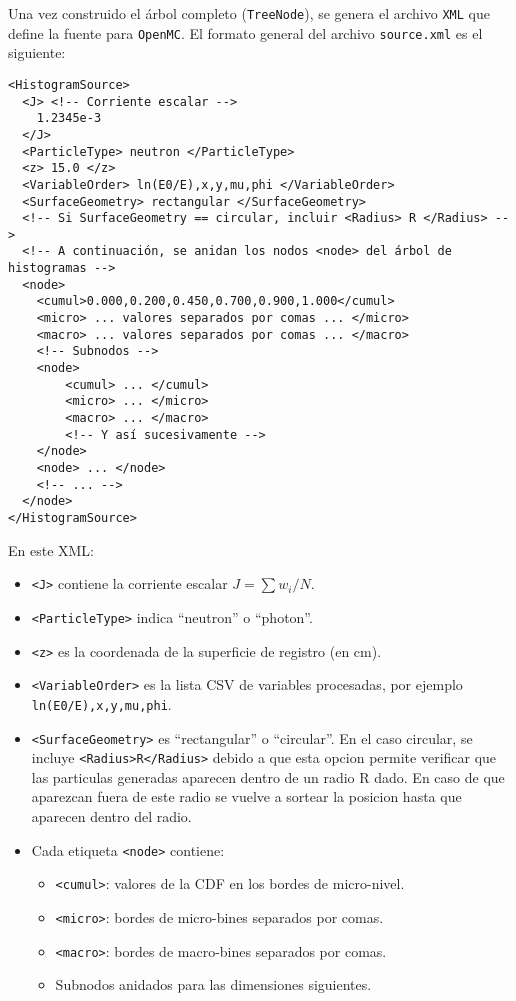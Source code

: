 Una vez construido el árbol completo (\texttt{TreeNode}), se genera el archivo \texttt{XML} que define la fuente para \texttt{OpenMC}. El formato general del archivo \texttt{source.xml} es el siguiente:

\begin{verbatim}
<HistogramSource>
  <J> <!-- Corriente escalar -->
    1.2345e-3
  </J>
  <ParticleType> neutron </ParticleType>
  <z> 15.0 </z>
  <VariableOrder> ln(E0/E),x,y,mu,phi </VariableOrder>
  <SurfaceGeometry> rectangular </SurfaceGeometry>
  <!-- Si SurfaceGeometry == circular, incluir <Radius> R </Radius> -->
  <!-- A continuación, se anidan los nodos <node> del árbol de histogramas -->
  <node>
    <cumul>0.000,0.200,0.450,0.700,0.900,1.000</cumul>
    <micro> ... valores separados por comas ... </micro>
    <macro> ... valores separados por comas ... </macro>
    <!-- Subnodos -->
    <node>
        <cumul> ... </cumul>
        <micro> ... </micro>
        <macro> ... </macro>
        <!-- Y así sucesivamente -->
    </node>
    <node> ... </node>
    <!-- ... -->
  </node>
</HistogramSource>
\end{verbatim}

\noindent En este XML:
\begin{itemize}
    \item \texttt{<J>} contiene la corriente escalar \(J = \sum w_i / N\).
    \item \texttt{<ParticleType>} indica ``neutron'' o ``photon''.
    \item \texttt{<z>} es la coordenada de la superficie de registro (en cm).
    \item \texttt{<VariableOrder>} es la lista CSV de variables procesadas, por ejemplo \texttt{ln(E0/E),x,y,mu,phi}.
    \item \texttt{<SurfaceGeometry>} es ``rectangular'' o ``circular''. En el caso circular, se incluye \texttt{<Radius>R</Radius>} debido a que esta opcion permite verificar que las particulas generadas aparecen dentro de un radio R dado. En caso de que aparezcan fuera de este radio se vuelve a sortear la posicion hasta que aparecen dentro del radio.
    \item Cada etiqueta \texttt{<node>} contiene:
    \begin{itemize}
        \item \texttt{<cumul>}: valores de la CDF en los bordes de micro-nivel.
        \item \texttt{<micro>}: bordes de micro-bines separados por comas.
        \item \texttt{<macro>}: bordes de macro-bines separados por comas.
        \item Subnodos anidados para las dimensiones siguientes.
    \end{itemize}
\end{itemize}

